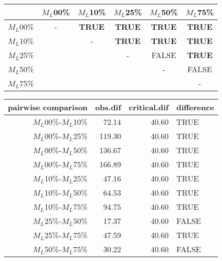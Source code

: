 \begin{tabular}{c|ccccc}
    \hline
              & $M_L$00\% & $M_L$10\% & $M_L$25\% & $M_L$50\% & $M_L$75\% \\
    \hline
    $M_L$00\% & - & \textbf{TRUE}  & \textbf{TRUE} & \textbf{TRUE} & \textbf{TRUE}\\
    $M_L$10\% & & - & \textbf{TRUE}  & \textbf{TRUE} & \textbf{TRUE} \\
    $M_L$25\% & & & - & FALSE  & \textbf{TRUE} \\
    $M_L$50\% & & & & - & FALSE  \\
    $M_L$75\% & & & & & - \\
    \hline
\end{tabular}
\centering
\begin{tabular}{rrrl}
 pairwise comparison & obs.dif & critical.dif & difference \\ 
  \hline
  $M_L$00\%-$M_L$10\% & 72.14 & 40.60 & TRUE \\
  $M_L$00\%-$M_L$25\% & 119.30 & 40.60 & TRUE \\
  $M_L$00\%-$M_L$50\% & 136.67 & 40.60 & TRUE \\
  $M_L$00\%-$M_L$75\% & 166.89 & 40.60 & TRUE \\ 
  $M_L$10\%-$M_L$25\% & 47.16 & 40.60 & TRUE \\ 
  $M_L$10\%-$M_L$50\% & 64.53 & 40.60 & TRUE \\ 
  $M_L$10\%-$M_L$75\% & 94.75 & 40.60 & TRUE \\ 
  $M_L$25\%-$M_L$50\% & 17.37 & 40.60 & FALSE \\
  $M_L$25\%-$M_L$75\% & 47.59 & 40.60 & TRUE \\ 
  $M_L$50\%-$M_L$75\% & 30.22 & 40.60 & FALSE \\
   \hline
\end{tabular}